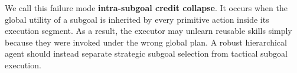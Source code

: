 \documentclass{article}
\newcommand{\wei}[1]{\textcolor{red}{#1}}
\begin{document}




We call this failure mode \textbf{intra-subgoal credit collapse}. It occurs when the global utility of a subgoal is inherited by every primitive action inside its execution segment. As a result, the executor may unlearn reusable skills simply because they were invoked under the wrong global plan. A robust hierarchical agent should instead separate strategic subgoal selection from tactical subgoal execution.

\end{document}
